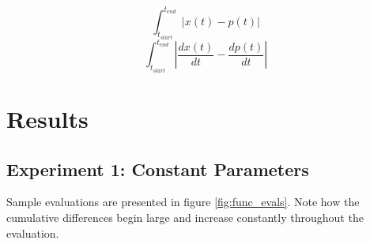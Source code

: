 \documentclass[11pt]{article}
\begin{document}
\begin{equation}
\label{eq:cumabs}
  \int_{t_{start}}^{t_{end}} | x(t) - p(t) |
\end{equation}
\begin{equation}
\label{eq:cumabs}
  \int_{t_{start}}^{t_{end}} | \frac{dx(t)}{dt} - \frac{dp(t)}{dt} |
\end{equation}

\section {Results}
\subsection {Experiment 1: Constant Parameters}
 Sample evaluations are presented
  in figure \ref{fig:func_evals}.  Note how the cumulative
   differences begin large and increase constantly throughout the evaluation.
\end{document}
